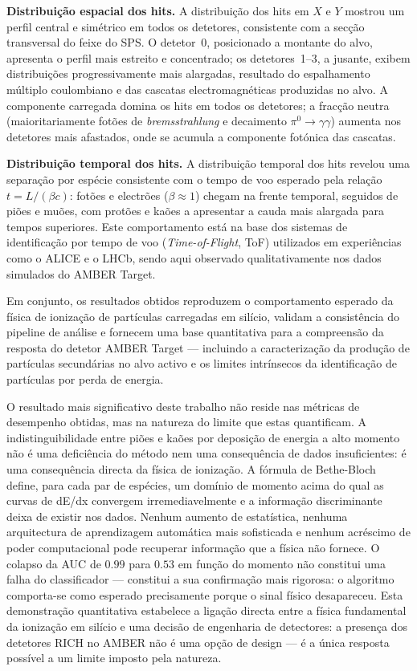 \documentclass[12pt,a4paper]{article}
\begin{document}
\textbf{Distribuição espacial dos hits.}
A distribuição dos hits em $X$ e $Y$ mostrou um perfil central e simétrico em
todos os detetores, consistente com a secção transversal do feixe do SPS. O
detetor~0, posicionado a montante do alvo, apresenta o perfil mais estreito e
concentrado; os detetores~1--3, a jusante, exibem distribuições progressivamente
mais alargadas, resultado do espalhamento múltiplo coulombiano e das cascatas
electromagnéticas produzidas no alvo. A componente carregada domina os hits em
todos os detetores; a fracção neutra (maioritariamente fotões de
\textit{bremsstrahlung} e decaimento $\pi^0 \to \gamma\gamma$) aumenta nos
detetores mais afastados, onde se acumula a componente fotónica das cascatas.

\textbf{Distribuição temporal dos hits.}
A distribuição temporal dos hits revelou uma separação por espécie consistente
com o tempo de voo esperado pela relação $t = L/(\beta c)$: fotões e electrões
($\beta \approx 1$) chegam na frente temporal, seguidos de piões e muões, com
protões e kaões a apresentar a cauda mais alargada para tempos superiores. Este
comportamento está na base dos sistemas de identificação por tempo de voo
(\textit{Time-of-Flight}, ToF) utilizados em experiências como o ALICE e o LHCb,
sendo aqui observado qualitativamente nos dados simulados do AMBER Target.

Em conjunto, os resultados obtidos reproduzem o comportamento esperado da física
de ionização de partículas carregadas em silício, validam a consistência do
pipeline de análise e fornecem uma base quantitativa para a compreensão da
resposta do detetor AMBER Target — incluindo a caracterização da produção de
partículas secundárias no alvo activo e os limites intrínsecos da identificação
de partículas por perda de energia.

O resultado mais significativo deste trabalho não reside nas métricas de
desempenho obtidas, mas na natureza do limite que estas quantificam. A
indistinguibilidade entre piões e kaões por deposição de energia a alto momento
não é uma deficiência do método nem uma consequência de dados insuficientes: é
uma consequência directa da física de ionização. A fórmula de Bethe-Bloch
define, para cada par de espécies, um domínio de momento acima do qual as
curvas de dE/dx convergem irremediavelmente e a informação discriminante deixa
de existir nos dados. Nenhum aumento de estatística, nenhuma arquitectura de
aprendizagem automática mais sofisticada e nenhum acréscimo de poder
computacional pode recuperar informação que a física não fornece. O colapso da
AUC de $0.99$ para $0.53$ em função do momento não constitui uma falha do
classificador --- constitui a sua confirmação mais rigorosa: o algoritmo
comporta-se como esperado precisamente porque o sinal físico desapareceu. Esta
demonstração quantitativa estabelece a ligação directa entre a física
fundamental da ionização em silício e uma decisão de engenharia de detectores:
a presença dos detetores RICH no AMBER não é uma opção de design --- é a única
resposta possível a um limite imposto pela natureza.
\end{document}
